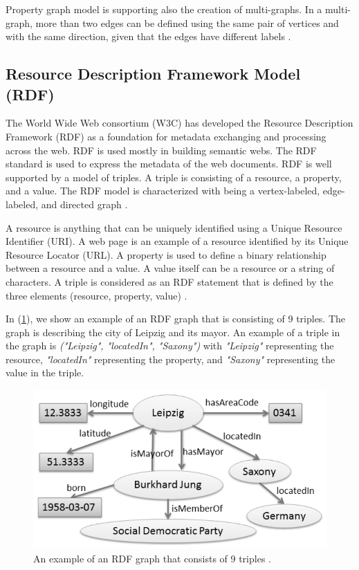 {Property graph model is supporting also the creation of multi-graphs. In a multi-graph, more than two edges can be defined using the same pair of vertices and with the same direction, given that the edges have different labels \cite{DBLP:journals/corr/abs-1006-2361, Robinson:2015:GDN:2846367}.



\subsection{Resource Description Framework Model (RDF)}
\label{subsec:RDF}

The World Wide Web consortium (W3C) has developed the Resource Description Framework (RDF) as a foundation for metadata exchanging and processing across the web. RDF is used mostly in building semantic webs. The RDF standard is used to express the metadata of the web documents. RDF is well supported by a model of triples. A triple is consisting of a resource, a property, and a value. The RDF model is characterized with being a vertex-labeled, edge-labeled, and directed graph \cite{ngomo2014introduction}.

A resource is anything that can be uniquely identified using a Unique Resource Identifier (URI). A web page is an example of a resource identified by its Unique Resource Locator (URL). A property is used to define a binary relationship between a resource and a value. A value itself can be a resource or a string of characters. A triple is considered as an RDF statement that is defined by the three elements (resource, property, value) \cite{Las99,Lee2005}.



In (\ref{fig:RDF}), we show an example of an RDF graph that is consisting of 9 triples. The graph is describing the city of Leipzig and its mayor. An example of a triple in the graph is \textit{("Leipzig", "locatedIn", "Saxony")} with \textit{"Leipzig"} representing the resource, \textit{"locatedIn"} representing the property, and \textit{"Saxony"} representing the value in the triple.


\begin{figure}[H]
\centering
\includegraphics[width=15cm]{pics/RDF-Graph.png}
\caption{An example of an RDF graph that consists of 9 triples \cite{ngomo2014introduction}.}
\label{fig:RDF}
\end{figure} 

}
